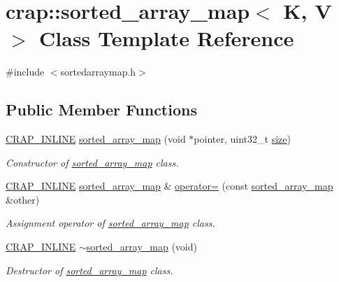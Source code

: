 \hypertarget{classcrap_1_1sorted__array__map}{}\section{crap\+:\+:sorted\+\_\+array\+\_\+map$<$ K, V $>$ Class Template Reference}
\label{classcrap_1_1sorted__array__map}


{\ttfamily \#include $<$sortedarraymap.\+h$>$}

\subsection*{Public Member Functions}
\begin{DoxyCompactItemize}
\item 
\hyperlink{config__x86_8h_a5a40526b8d842e7ff731509998bb0f1c}{C\+R\+A\+P\+\_\+\+I\+N\+L\+I\+N\+E} \hyperlink{classcrap_1_1sorted__array__map_a9a233164617d4b4337942f07660f0c96}{sorted\+\_\+array\+\_\+map} (void $\ast$pointer, uint32\+\_\+t \hyperlink{classcrap_1_1sorted__array__map_ac22f99bfda9db68c9b72f20cd91ea860}{size})
\begin{DoxyCompactList}\small\item\em Constructor of \hyperlink{classcrap_1_1sorted__array__map}{sorted\+\_\+array\+\_\+map} class. \end{DoxyCompactList}\item 
\hyperlink{config__x86_8h_a5a40526b8d842e7ff731509998bb0f1c}{C\+R\+A\+P\+\_\+\+I\+N\+L\+I\+N\+E} \hyperlink{classcrap_1_1sorted__array__map}{sorted\+\_\+array\+\_\+map} \& \hyperlink{classcrap_1_1sorted__array__map_ae26efcb34dd8867d0a1ee3beaf6bf2e1}{operator=} (const \hyperlink{classcrap_1_1sorted__array__map}{sorted\+\_\+array\+\_\+map} \&other)
\begin{DoxyCompactList}\small\item\em Assignment operator of \hyperlink{classcrap_1_1sorted__array__map}{sorted\+\_\+array\+\_\+map} class. \end{DoxyCompactList}\item 
\hyperlink{config__x86_8h_a5a40526b8d842e7ff731509998bb0f1c}{C\+R\+A\+P\+\_\+\+I\+N\+L\+I\+N\+E} \hyperlink{classcrap_1_1sorted__array__map_a6015049261eab02d8d519c6cdc852abc}{$\sim$sorted\+\_\+array\+\_\+map} (void)
\begin{DoxyCompactList}\small\item\em Destructor of \hyperlink{classcrap_1_1sorted__array__map}{sorted\+\_\+array\+\_\+map} class. \end{DoxyCompactList}\item 

\end{DoxyCompactItemize}
